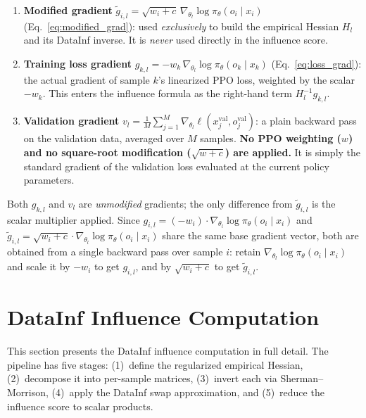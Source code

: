 \documentclass{article}
\begin{document}
\begin{enumerate}
    \item \textbf{Modified gradient} $\tilde{g}_{i,l} = \sqrt{w_i+c}\,\nabla_{\theta_l}\log\pi_\theta(o_i\mid x_i)$
    (Eq.~\eqref{eq:modified_grad}): used \emph{exclusively} to build the empirical Hessian $H_l$ and its DataInf inverse. It is \emph{never} used directly in the influence score.

    \item \textbf{Training loss gradient} $g_{k,l} = -w_k\,\nabla_{\theta_l}\log\pi_\theta(o_k\mid x_k)$
    (Eq.~\eqref{eq:loss_grad}): the actual gradient of sample $k$'s linearized PPO loss, weighted by the scalar $-w_k$. This enters the influence formula as the right-hand term $H_l^{-1}g_{k,l}$.

    \item \textbf{Validation gradient} $v_l = \frac{1}{M}\sum_{j=1}^{M}\nabla_{\theta_l}\ell(x_j^{\mathrm{val}},o_j^{\mathrm{val}})$: a plain backward pass on the validation data, averaged over $M$ samples. \textbf{No PPO weighting ($w$) and no square-root modification ($\sqrt{w+c}$) are applied.} It is simply the standard gradient of the validation loss evaluated at the current policy parameters.
\end{enumerate}

Both $g_{k,l}$ and $v_l$ are \emph{unmodified} gradients; the only difference from $\tilde{g}_{i,l}$ is the scalar multiplier applied.
Since $g_{i,l} = (-w_i)\cdot\nabla_{\theta_l}\log\pi_\theta(o_i\mid x_i)$ and $\tilde{g}_{i,l} = \sqrt{w_i+c}\cdot\nabla_{\theta_l}\log\pi_\theta(o_i\mid x_i)$ share the same base gradient vector, both are obtained from a single backward pass over sample $i$: retain $\nabla_{\theta_l}\log\pi_\theta(o_i\mid x_i)$ and scale it by $-w_i$ to get $g_{i,l}$, and by $\sqrt{w_i+c}$ to get $\tilde{g}_{i,l}$.


\section{DataInf Influence Computation}

This section presents the DataInf influence computation in full detail.
The pipeline has five stages: (1)~define the regularized empirical Hessian, (2)~decompose it into per-sample matrices, (3)~invert each via Sherman--Morrison, (4)~apply the DataInf swap approximation, and (5)~reduce the influence score to scalar products.
\end{document}
